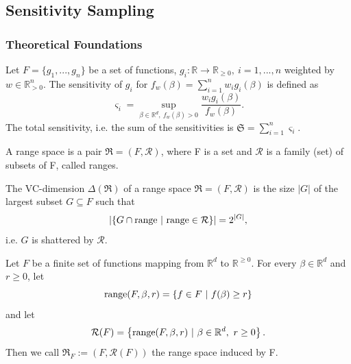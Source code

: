 \subsection{Sensitivity Sampling}

\subsubsection{Theoretical Foundations}

\begin{definition}
    \label{def:sensitivity}
    Let $F = \{ g_1, ..., g_n \}$ be a set of functions,
    $g_i: \mathbb{R} \rightarrow \mathbb{R}_{\geq 0}, \ i=1,...,n$ weighted by
    $w \in \mathbb{R}^n_{>0}$.
    The sensitivity of $g_i$ for $f_w(\beta) = \sum_{i=1}^n w_i g_i(\beta)$ is defined as
    \begin{equation*}
        \varsigma_i = \sup_{\beta \in \mathbb{R}^d, \ f_w(\beta) > 0} \frac{w_i g_i(\beta)}{f_w(\beta)}.
    \end{equation*}
    The total sensitivity, i.e. the sum of the sensitivities is $\mathfrak{S} = \sum_{i=1}^n \varsigma_i$.
\end{definition}

\begin{definition}
    A range space is a pair $\mathfrak{R} = (F, \mathcal{R})$, where F is a set
    and $\mathcal{R}$ is a family (set) of subsets of F, called
    ranges.
\end{definition}

\begin{definition}
    The VC-dimension $\Delta(\mathfrak{R})$ of a range space $\mathfrak{R} = (F, \mathcal{R})$ is
    the size $|G|$ of the largest subset $G \subseteq F$ such that
    \begin{equation*}
        \left| \left\{ G \cap \textup{range} \ | \ \textup{range} \in \mathcal{R} \right\} \right|
        = 2^{|G|},
    \end{equation*}
    i.e. $G$ is shattered by $\mathcal{R}$.
\end{definition}

\begin{definition}
    Let $F$ be a finite set of functions mapping from $\mathbb{R}^d$ to $\mathbb{R}^{\geq 0}$.
    For every $\beta \in \mathbb{R}^d$ and $r \geq 0$, let
    \begin{equation*}
        \textup{range}(F, \beta, r) = \left\{ f \in F \ | \  f(\beta) \geq r  \right\}
    \end{equation*}
    and let
    \begin{equation*}
        \mathcal{R}(F) = \left\{ \textup{range}(F, \beta, r) \ | \ \beta \in \mathbb{R}^d, \ r \geq 0  \right\}.
    \end{equation*}
    Then we call $\mathfrak{R}_F := (F, \mathcal{R}(F))$ the range space induced by F.
\end{definition}

